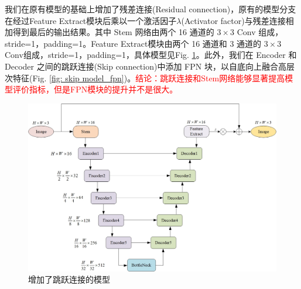 \documentclass[a4paper]{ctexart}
\begin{document}
		我们在原有模型的基础上增加了残差连接(Residual connection)，原有的模型分支在经过Feature Extract模块后乘以一个激活因子$\lambda$(Activator factor)与残差连接相加得到最后的输出结果。其中 Stem 网络由两个 16 通道的 $3\times 3$ Conv 组成，stride=1，padding=1。Feature Extract模块由两个 16 通道和 3 通道的 $3 \times 3$ Conv组成，stride=1，padding=1，具体模型见Fig. \ref{fig: skip model}。此外，我们在 Encoder 和 Decoder 之间的跳跃连接(Skip connection)中添加 FPN 块，以自底向上融合高层次特征(Fig. \ref{fig: skip model_fpn})。\textcolor{red}{结论：跳跃连接和Stem网络能够显著提高模型评价指标，但是FPN模块的提升并不是很大。}
		
		
		
		
		\begin{figure}[htbp]
			\centering
			\includegraphics[width=0.7\linewidth]{picture/LLIE/My Architecture/skip_model}
			\caption{增加了跳跃连接的模型}
			\label{fig: skip model}	
		\end{figure}
		
\end{document}
